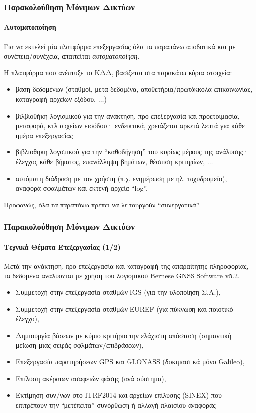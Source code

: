 \begin{frame}
  \frametitle{Παρακολούθηση Μόνιμων Δικτύων}
  \framesubtitle{Αυτοματοποίηση}
  \label{}

    Για να εκτελεί μία πλατφόρμα επεξεργασίας όλα τα παραπάνω αποδοτικά και με συνέπεια/συνέχεια, απαιτείται
    \emph{αυτοματοποίηση}.
    \vspace{0.3cm}

    Η πλατφόρμα που ανέπτυξε το ΚΔΔ, βασίζεται στα παρακάτω κύρια στοιχεία:
    \begin{itemize}
        \item βάση δεδομένων (σταθμοί, μετα-δεδομένα, αποθετήρια/πρωτόκκολα επικοινωνίας, καταγραφή αρχείων εξόδου, $\ldots$)
        \item βιλβιοθήκη λογισμικού για την ανάκτηση, προ-επεξεργασία και προετοιμασία, μεταφορά, κτλ αρχείων εισόδου·
            ενδεικτικά, χρειάζεται αρκετά λεπτά για κάθε ημέρα επεξεργασίας
        \item βιβλιοθηκη λογσμικού για την ``καθοδήγηση'' του κυρίως μέρους της ανάλυσης· έλεγχος κάθε βήματος,
            επανάλληψη βημάτων, θέσπιση κριτηρίων, $\ldots$
        \item αυτόματη διάδραση με τον χρήστη (π.χ. ενημέρωση με ηλ. ταχυδρομείο), αναφορά σφαλμάτων και εκτενή
            αρχεία ``log''.
    \end{itemize}
    \vspace{0.3cm}

    Προφανώς, όλα τα παραπάνω πρέπει να λειτουργούν ``συνεργατικά''.
\end{frame}
\note{}

\begin{frame}
  \frametitle{Παρακολούθηση Μόνιμων Δικτύων}
  \framesubtitle{Τεχνικά Θέματα Επεξεργασίας (1/2)}
  \label{}

    Μετά την ανάκτηση, προ-επεξεργασία και καταγραφή της απαραίτητης πληροφορίας, τα
    δεδομένα αναλύονται με χρήση του λογισμικού Bernese GNSS Software v5.2.
    \begin{itemize}
        \item Συμμετοχή στην επεξεργασία σταθμών IGS (για την υλοποίηση Σ.Α.),
        \item Συμμετοχή στην επεξεργασία σταθμών EUREF (για πύκνωση και ποιοτικό έλεγχο),
        \item Δημιουργία βάσεων με κύριο κριτήριο την ελάχιστη απόσταση (σημαντική μείωση μιας σειράς σφλμάτων/επιδράσεων),
        \item Επεξεργασία παρατηρήσεων GPS και GLONASS (δοκιμαστικά μόνο Galileo),
        \item Επίλυση ακέραιων ασαφειών φάσης (ανά σύστημα),
        \item Εκτίμηση συν/νων στο ITRF2014 και αρχείων επίλυσης (SINEX) που επιτρέπουν την ``μετέπειτα'' συνόρθωση ή αλλαγή πλαισίου αναφοράς
    \end{itemize}
\end{frame}
\note{}

